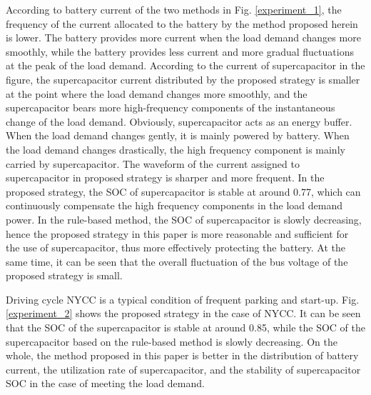 \documentclass[energies,article,submit,moreauthors,pdftex,10pt,a4paper]{Definitions/mdpi}
\begin{document}
According to battery current of the two methods in Fig. \ref{experiment_1}, the frequency of the current allocated to the battery by the method proposed herein is lower. The battery provides more current when the load demand changes more smoothly, while the battery provides less current and more gradual fluctuations at the peak of the load demand.
According to the current of supercapacitor in the figure, the supercapacitor current distributed by the proposed strategy is smaller at the point where the load demand changes more smoothly, and the supercapacitor bears more high-frequency components of the instantaneous change of the load demand.
Obviously, supercapacitor acts as an energy buffer. When the load demand changes gently, it is mainly powered by battery. When the load demand changes drastically, the high frequency component is mainly carried by supercapacitor. The waveform of the current assigned to supercapacitor in proposed strategy is sharper and more frequent.
In the proposed strategy, the SOC of supercapacitor is stable at around 0.77, which can continuously compensate the high frequency components in the load demand power. In the rule-based method, the SOC of supercapacitor is slowly decreasing, hence the proposed strategy in this paper is more reasonable and sufficient for the use of supercapacitor, thus more effectively protecting the battery. At the same time, it can be seen that the overall fluctuation of the bus voltage of the proposed strategy is small.
 
Driving cycle NYCC is a typical condition of frequent parking and start-up. Fig. \ref{experiment_2} shows the proposed strategy in the case of NYCC. It can be seen that the SOC of the supercapacitor is stable at around 0.85, while the SOC of the supercapacitor based on the rule-based method is slowly decreasing.
On the whole, the method proposed in this paper is better in the distribution of battery current, the utilization rate of supercapacitor, and the stability of supercapacitor SOC in the case of meeting the load demand.
\end{document}
